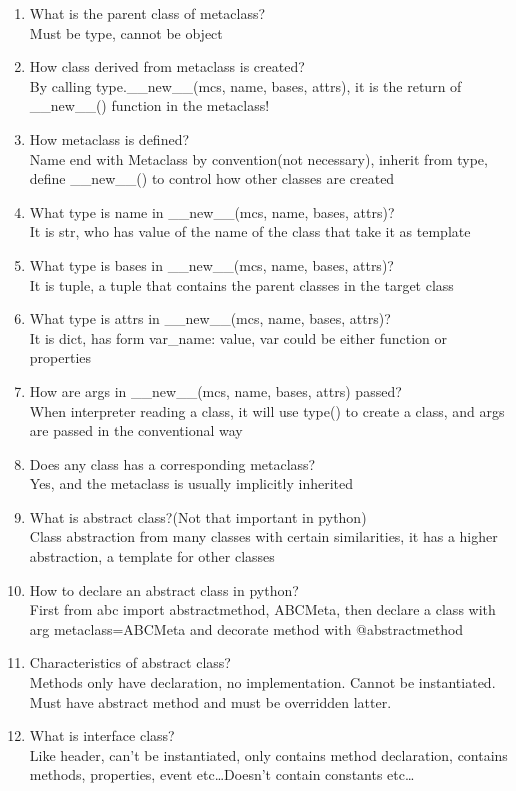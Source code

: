 \documentclass[10pt,a4paper,oneside]{article}
\begin{document}
\begin{enumerate}[1.]
\item What is the parent class of metaclass?\\
Must be type, cannot be object
\item How class derived from metaclass is created?\\
By calling type.\_\_new\_\_(mcs, name, bases, attrs), it is the return of \_\_new\_\_() function in the metaclass!
\item How metaclass is defined?\\
Name end with Metaclass by convention(not necessary), inherit from type, define \_\_new\_\_() to control how other classes are created
\item What type is name in \_\_new\_\_(mcs, name, bases, attrs)?\\
It is str, who has value of the name of the class that take it as template
\item What type is bases in \_\_new\_\_(mcs, name, bases, attrs)?\\
It is tuple, a tuple that contains the parent classes in the target class
\item What type is attrs in \_\_new\_\_(mcs, name, bases, attrs)?\\
It is dict, has form var\_name: value, var could be either function or properties
\item How are args in \_\_new\_\_(mcs, name, bases, attrs) passed?\\
When interpreter reading a class, it will use type() to create a class, and args are passed in the conventional way
\item Does any class has a corresponding metaclass?\\
Yes, and the metaclass is usually implicitly inherited
\item What is abstract class?(Not that important in python)\\
Class abstraction from many classes with certain similarities, it has a higher abstraction, a template for other classes
\item How to declare an abstract class in python?\\
First from abc import abstractmethod, ABCMeta, then declare a class with arg metaclass=ABCMeta and decorate method with @abstractmethod
\item Characteristics of abstract class?\\
Methods only have declaration, no implementation. Cannot be instantiated. Must have abstract method and must be overridden latter.
\item What is interface class?\\
Like header, can’t be instantiated, only contains method declaration, contains methods, properties, event etc\dots Doesn’t contain constants etc\dots
\end{enumerate}
\end{document}
